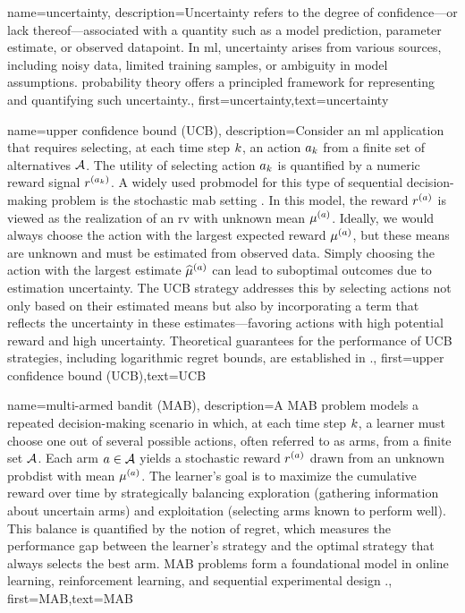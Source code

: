 {name={uncertainty},
	description={Uncertainty refers to the degree of confidence—or 
		lack thereof—associated with a quantity such as a \gls{model} \gls{prediction}, parameter estimate, or 
		observed \gls{datapoint}. In \gls{ml}, uncertainty arises from various sources, including 
		noisy \gls{data}, limited training \gls{sample}s, or ambiguity in \gls{model} assumptions. \Gls{probability} theory 
		offers a principled framework for representing and quantifying such uncertainty.},
	first={uncertainty},text={uncertainty}
}

{name={upper confidence bound (UCB)},
	description={Consider an \gls{ml} 
		application that requires selecting, at each time step $k$, an action $a_{k}$ 
		from a finite set of alternatives $\mathcal{A}$. The utility of selecting action $a_{k}$ 
		is quantified by a numeric \gls{reward} signal $r^{(a_{k})}$. 
		A widely used \gls{probmodel} for this type of sequential decision-making problem 
		is the stochastic \gls{mab} setting \cite{Bubeck2012}. In this \gls{model}, 
		the \gls{reward} $r^{(a)}$ is viewed as the \gls{realization} of an \gls{rv} 
		with unknown \gls{mean} $\mu^{(a)}$. Ideally, we would always choose the 
		action with the largest expected \gls{reward} $\mu^{(a)}$, but these 
		\gls{mean}s are unknown and must be estimated from observed \gls{data}. Simply 
		choosing the action with the largest estimate $\widehat{\mu}^{(a)}$ can 
		lead to suboptimal outcomes due to estimation \gls{uncertainty}. The UCB strategy 
		addresses this by selecting actions not only based on their estimated \gls{mean}s but 
		also by incorporating a term that reflects the \gls{uncertainty} in these estimates—favoring 
		actions with high potential \gls{reward} and high \gls{uncertainty}. Theoretical guarantees 
		for the performance of UCB strategies, including logarithmic \gls{regret} bounds, are established in \cite{Bubeck2012}.},
	first={upper confidence bound (UCB)},text={UCB} 
}

{name={multi-armed bandit (MAB)},
	description={A MAB problem models 
		a repeated decision-making scenario in which, at each time step $k$, a learner must 
		choose one out of several possible actions, often referred to as arms, from a finite 
		set $\mathcal{A}$. Each arm $a \in \mathcal{A}$ yields a stochastic \gls{reward} $r^{(a)}$ 
		drawn from an unknown \gls{probdist} with \gls{mean} $\mu^{(a)}$. 
		The learner’s goal is to maximize the cumulative \gls{reward} over time by 
		strategically balancing exploration (gathering information about 
		uncertain arms) and exploitation (selecting arms known to perform well). 
		This balance is quantified by the notion of \gls{regret}, which measures the performance 
		gap between the learner's strategy and the optimal strategy that always selects the best arm. 
		MAB problems form a foundational \gls{model} in online learning, reinforcement learning, 
		and sequential experimental design \cite{Bubeck2012}.},
	first={MAB},text={MAB}
}



